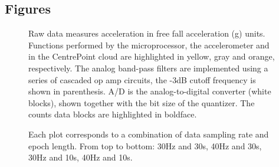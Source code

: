 \documentclass{bmcart}
\begin{document}
\begin{backmatter}
	\section*{Figures}
	\begin{figure}[h!]
		\caption{
			Raw data measures acceleration in free fall
			acceleration (g) units. Functions performed by the microprocessor, the
			accelerometer and in the CentrePoint cloud are highlighted in yellow, gray and
			orange, respectively. The analog band-pass filters are implemented using a
			series of cascaded op amp circuits, the -3dB cutoff frequency is shown in
			parenthesis. A/D is the analog-to-digital converter (white blocks), shown
			together with the bit size of the quantizer. The counts data blocks are
			highlighted in boldface.}
		\label{fig:pipeline}
	\end{figure}
	\begin{figure}[h!]
		\caption{}
		\label{fig:alg}
	\end{figure}
	\begin{figure}[h!]
		\caption{ Each plot corresponds to a
			combination of data sampling rate and epoch length. From top to bottom: 30Hz
			and 30s, 40Hz and 30s, 30Hz and 10s, 40Hz and 10s.
			\label{fig:results}
		}
	\end{figure}


\end{backmatter}
\end{document}
